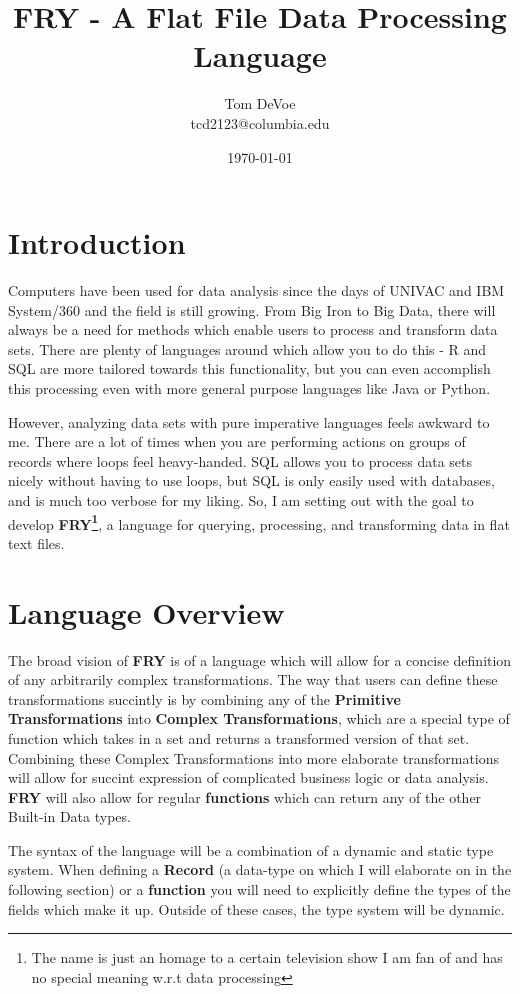 \documentclass{article}
\title{FRY - A Flat File Data Processing Language}
\author{Tom DeVoe\\ tcd2123@columbia.edu}
\date{\today}
\begin{document}
\maketitle

\section{Introduction} 
Computers have been used for data analysis since the days of UNIVAC and IBM System/360 and the field is still growing. From Big Iron to Big Data, there will always be a need for methods which enable users to process and transform data sets. There are plenty of languages around which allow you to do this - R and SQL are more tailored towards this functionality, but you can even accomplish this processing even with more general purpose languages like Java or Python. 

However, analyzing data sets with pure imperative languages feels awkward to me. There are a lot of times when you are performing actions on groups of records where loops feel heavy-handed. SQL allows you to process data sets nicely without having to use loops, but SQL is only easily used with databases, and is much too verbose for my liking. So, I am setting out with the goal to develop \textbf{FRY\footnote{The name is just an homage to a certain television show I am fan of and has no special meaning w.r.t data processing}}, a language for querying, processing, and transforming data in flat text files. 

\section{Language Overview}

The broad vision of \textbf{FRY} is of a language which will allow for a concise definition of any arbitrarily complex transformations. The way that users can define these transformations succintly is by combining any of the \textbf{Primitive Transformations} into \textbf{Complex Transformations}, which are a special type of function which takes in a set and returns a transformed version of that set. Combining these Complex Transformations into more elaborate transformations will allow for succint expression of complicated business logic or data analysis. \textbf{FRY} will also allow for regular \textbf{functions} which can return any of the other Built-in Data types. 

The syntax of the language will be a combination of a dynamic and static type system. When defining a \textbf{Record} (a data-type on which I will elaborate on in the following section) or a \textbf{function} you will need to explicitly define the types of the fields which make it up. Outside of these cases, the type system will be dynamic.
\end{document}
